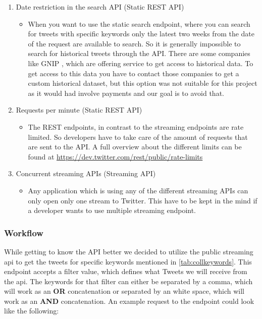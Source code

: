\documentclass[11pt,titlepage,oneside,openany]{book}
\begin{document}
\begin{enumerate}
   \item Date restriction in the search API (Static REST API)
   \begin{itemize}
     \item When you want to use the static search endpoint, where you can search for tweets with specific keywords only the latest two weeks from the date of the request are available to search. So it is generally impossible to search for historical tweets through the API. There are some companies like GNIP \cite{Gnip2015-10-20}, which are offering service to get access to historical data. To get access to this data you have to contact those companies to get a custom historical dataset, but this option was not suitable for this project as it would had involve payments and our goal is to avoid that.
   \end{itemize}
   \item Requests per minute (Static REST API)
   \begin{itemize}
     \item The REST endpoints, in contrast to the streaming endpoints are rate limited. So developers have to take care of the amount of requests that are sent to the API. A full overview about the different limits can be found at \url{https://dev.twitter.com/rest/public/rate-limits} \cite{Twitter2016-11-22}
   \end{itemize}
   \item Concurrent streaming APIs (Streaming API)
   \begin{itemize}
     \item Any application which is using any of the different streaming APIs can only open only one stream to Twitter. This have to be kept in the mind if a developer wants to use multiple streaming endpoint. 
   \end{itemize}

\end{enumerate}



\subsubsection{Workflow}

While getting to know the API better we decided to utilize the public streaming \acrshort{api} to get the tweets for specific keywords mentioned in \autoref{tab:collkeywords}. This endpoint accepts a filter value, which defines what Tweets we will receive from the \acrshort{api}. The keywords for that filter can either be separated by a comma, which will work as an \textbf{OR} concatenation or separated by an white space, which will work as an \textbf{AND} concatenation. An example request to the endpoint could look like the following:
\end{document}
